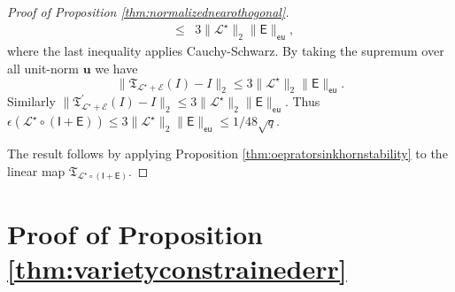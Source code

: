 \documentclass[11pt,letterpaper]{article}
\newcommand{\bu}{\mathbf{u}}
\newcommand{\sfe}{\mathsf{E}}
\newcommand{\sfi}{\mathsf{I}}
\newcommand{\sfq}{\mathcal{Q}}
\newcommand{\eu}{\mathsf{eu}}
\begin{document}
\begin{proof}[Proof of Proposition \ref{thm:normalizednearothogonal}]
\begin{eqnarray*}
		& \leq & 3 \|\mathcal{L}^{\star}\|_2 \|\sfe\|_{\eu},
	\end{eqnarray*}
	where the last inequality applies Cauchy-Schwarz.  By taking the supremum over all unit-norm $\bu$ we have
	\begin{equation*}
		\| \mathfrak{T}_{\mathcal{L}^{\star} + \mathcal{E}} (I)  - I \|_2 \leq 3 \|\mathcal{L}^{\star}\|_2 \|\sfe\|_{\eu}.
	\end{equation*}
	Similarly $\| \mathfrak{T}_{\mathcal{L}^{\star} + \mathcal{E}}^{\prime} (I)  - I \|_2 \leq 3 \|\mathcal{L}^{\star}\|_2 \|\sfe\|_{\eu}$.  Thus $\epsilon (\mathcal{L}^{\star} \circ (\sfi+\sfe)) \leq 3 \|\mathcal{L}^{\star}\|_2 \|\sfe\|_{\eu} \leq 1/ 48\sqrt{q}$.
	
	
	
	
	The result follows by applying Proposition \ref{thm:oepratorsinkhornstability} to the linear map $\mathfrak{T}_{\mathcal{L}^{\star} \circ (\sfi+\sfe)}$.
\end{proof}


\section{Proof of Proposition \ref{thm:varietyconstrainederr}} \label{apx:varietyanalysis}
\end{document}
